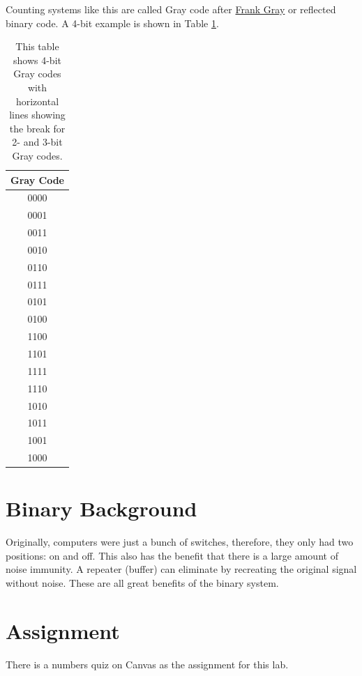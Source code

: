 Counting systems like this are called Gray code after \href{https://en.wikipedia.org/wiki/Gray_code}{Frank Gray} 
or reflected binary code. A 4-bit example is shown in Table \ref{table:graycode}.

\begin{table}[!ht]
	\centering
	\begin{tabular}{c}
		\hline
		{Gray Code}   \\ 
		\hline
		0000 \\
		0001 \\
		0011 \\
		0010 \\
		\hline
		0110 \\
		0111 \\
		0101 \\
		0100 \\
		\hline
		1100 \\
		1101 \\
		1111 \\
		1110 \\
		1010 \\
		1011 \\
		1001 \\
		1000 \\
		\hline
	\end{tabular}
	\caption{This table shows 4-bit Gray codes with horizontal lines showing the break for 2- and 3-bit Gray codes.}
	\label{table:graycode}
\end{table}

\section{Binary Background}
Originally, computers were just a bunch of switches, therefore, they only had two positions: on and off. 
This also has the benefit that there is a large amount of noise immunity. A repeater (buffer) can eliminate 
by recreating the original signal without noise. These are all great benefits of the binary system.

\section{Assignment}
There is a numbers quiz on Canvas as the assignment for this lab.